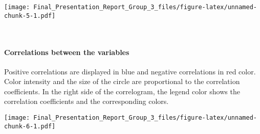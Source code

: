 \documentclass[
]{article}
\newenvironment{Shaded}{\begin{snugshade}}{\end{snugshade}}
\newcommand{\CommentTok}[1]{\textcolor[rgb]{0.56,0.35,0.01}{\textit{#1}}}
\newcommand{\DataTypeTok}[1]{\textcolor[rgb]{0.13,0.29,0.53}{#1}}
\newcommand{\DecValTok}[1]{\textcolor[rgb]{0.00,0.00,0.81}{#1}}
\newcommand{\FloatTok}[1]{\textcolor[rgb]{0.00,0.00,0.81}{#1}}
\newcommand{\KeywordTok}[1]{\textcolor[rgb]{0.13,0.29,0.53}{\textbf{#1}}}
\newcommand{\NormalTok}[1]{#1}
\newcommand{\OperatorTok}[1]{\textcolor[rgb]{0.81,0.36,0.00}{\textbf{#1}}}
\newcommand{\StringTok}[1]{\textcolor[rgb]{0.31,0.60,0.02}{#1}}
\begin{document}
\begin{Shaded}
\end{Shaded}

\texttt{[image: Final\_Presentation\_Report\_Group\_3\_files/figure-latex/unnamed-chunk-5-1.pdf]}

~

\hypertarget{correlations-between-the-variables}{%
\paragraph{Correlations between the
variables}\label{correlations-between-the-variables}}

Positive correlations are displayed in blue and negative correlations in
red color. Color intensity and the size of the circle are proportional
to the correlation coefficients. In the right side of the correlogram,
the legend color shows the correlation coefficients and the
corresponding colors.

\begin{Shaded}
\end{Shaded}

\texttt{[image: Final\_Presentation\_Report\_Group\_3\_files/figure-latex/unnamed-chunk-6-1.pdf]}

~
\end{document}
